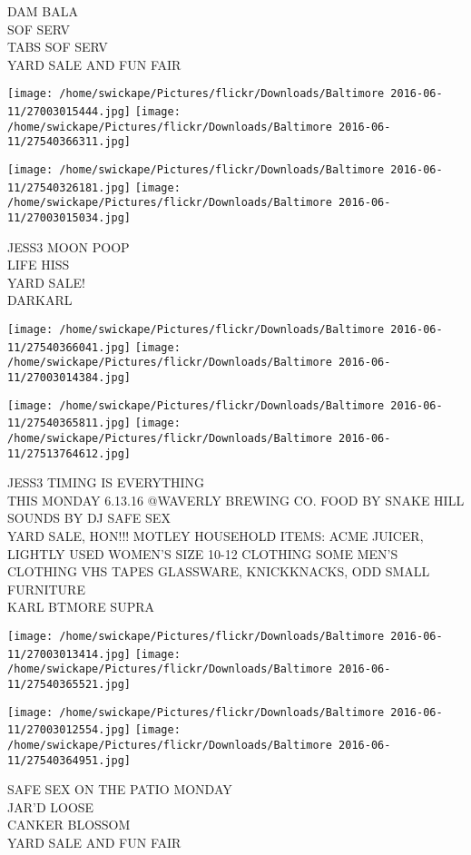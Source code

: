 \documentclass[10pt,letterpaper]{article}
\begin{document}
DAM BALA\\
SOF SERV\\
TABS SOF SERV\\
YARD SALE AND FUN FAIR
\pagebreak

\texttt{[image: /home/swickape/Pictures/flickr/Downloads/Baltimore 2016-06-11/27003015444.jpg]}
\texttt{[image: /home/swickape/Pictures/flickr/Downloads/Baltimore 2016-06-11/27540366311.jpg]}

\texttt{[image: /home/swickape/Pictures/flickr/Downloads/Baltimore 2016-06-11/27540326181.jpg]}
\texttt{[image: /home/swickape/Pictures/flickr/Downloads/Baltimore 2016-06-11/27003015034.jpg]}

JESS3 MOON POOP\\
LIFE HISS\\
YARD SALE!\\
DARKARL
\pagebreak

\texttt{[image: /home/swickape/Pictures/flickr/Downloads/Baltimore 2016-06-11/27540366041.jpg]}
\texttt{[image: /home/swickape/Pictures/flickr/Downloads/Baltimore 2016-06-11/27003014384.jpg]}

\texttt{[image: /home/swickape/Pictures/flickr/Downloads/Baltimore 2016-06-11/27540365811.jpg]}
\texttt{[image: /home/swickape/Pictures/flickr/Downloads/Baltimore 2016-06-11/27513764612.jpg]}

JESS3 TIMING IS EVERYTHING\\
THIS MONDAY 6.13.16 @WAVERLY BREWING CO. FOOD BY SNAKE HILL SOUNDS BY DJ SAFE SEX\\
YARD SALE, HON!!! MOTLEY HOUSEHOLD ITEMS: ACME JUICER, LIGHTLY USED WOMEN'S SIZE 10{-}12 CLOTHING SOME MEN'S CLOTHING VHS TAPES GLASSWARE, KNICKKNACKS, ODD SMALL FURNITURE\\
KARL BTMORE SUPRA
\pagebreak

\texttt{[image: /home/swickape/Pictures/flickr/Downloads/Baltimore 2016-06-11/27003013414.jpg]}
\texttt{[image: /home/swickape/Pictures/flickr/Downloads/Baltimore 2016-06-11/27540365521.jpg]}

\texttt{[image: /home/swickape/Pictures/flickr/Downloads/Baltimore 2016-06-11/27003012554.jpg]}
\texttt{[image: /home/swickape/Pictures/flickr/Downloads/Baltimore 2016-06-11/27540364951.jpg]}

SAFE SEX ON THE PATIO MONDAY\\
JAR'D LOOSE\\
CANKER BLOSSOM\\
YARD SALE AND FUN FAIR
\pagebreak
\end{document}
